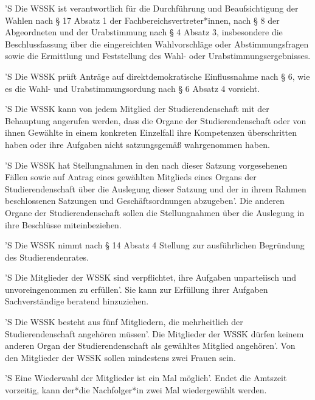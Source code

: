 \documentclass[fontsize=12pt,parskip=half]{scrartcl}
\begin{document}
\begin{contract}


  'S Die WSSK ist verantwortlich für die Durchführung und Beaufsichtigung der
  Wahlen nach § 17 Absatz 1 der Fachbereichsvertreter*innen, nach § 8 der
  Abgeordneten und der Urabstimmung nach § 4 Absatz 3, insbesondere die
  Beschlussfassung über die eingereichten Wahlvorschläge oder Abstimmungsfragen
  sowie die Ermittlung und Feststellung des Wahl- oder Urabstimmungsergebnisses.

  'S Die WSSK prüft Anträge auf direktdemokratische Einflussnahme nach § 6, wie es
  die Wahl- und Urabstimmungsordung nach § 6 Absatz 4 vorsieht.

  'S Die WSSK kann von jedem Mitglied der Studierendenschaft mit der Behauptung
  angerufen werden, dass die Organe der Studierendenschaft oder von ihnen
  Gewählte in einem konkreten Einzelfall ihre Kompetenzen überschritten haben
  oder ihre Aufgaben nicht satzungsgemäß wahrgenommen haben.

  'S Die WSSK hat Stellungnahmen in den nach dieser Satzung vorgesehenen Fällen
  sowie auf Antrag eines gewählten Mitglieds eines Organs der Studierendenschaft
  über die Auslegung dieser Satzung und der in ihrem Rahmen beschlossenen
  Satzungen und Geschäftsordnungen abzugeben'. Die anderen Organe der
  Studierendenschaft sollen die Stellungnahmen über die Auslegung in ihre
  Beschlüsse miteinbeziehen.

  'S Die WSSK nimmt nach § 14 Absatz 4 Stellung zur ausführlichen Begründung des
  Studierendenrates.

  'S Die Mitglieder der WSSK sind verpflichtet, ihre Aufgaben unparteiisch und
  unvoreingenommen zu erfüllen'. Sie kann zur Erfüllung ihrer Aufgaben
  Sachverständige beratend hinzuziehen.



  'S Die WSSK besteht aus fünf Mitgliedern, die mehrheitlich der Studierendenschaft
  angehören müssen'. Die Mitglieder der WSSK dürfen keinem anderen Organ der
  Studierendenschaft als gewähltes Mitglied angehören'. Von den Mitglieder der
  WSSK sollen mindestens zwei Frauen sein.

  'S Eine Wiederwahl der Mitglieder ist ein Mal möglich'. Endet die Amtszeit
  vorzeitig, kann der*die Nachfolger*in zwei Mal wiedergewählt werden.



\end{contract}
\end{document}
